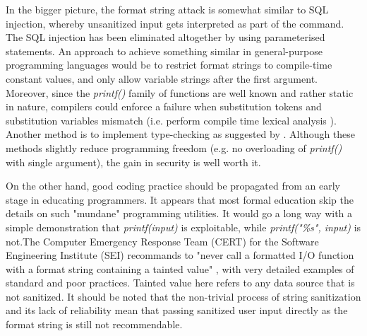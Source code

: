 In the bigger picture, the format string attack is somewhat similar to SQL injection, whereby unsanitized input gets interpreted as part of the command. The SQL injection has been eliminated altogether by using parameterised statements. An approach to achieve something similar in general-purpose programming languages would be to restrict format strings to compile-time constant values, and only allow variable strings after the first argument. Moreover, since the \emph{printf()} family of functions are well known and rather static in nature, compilers could enforce a failure when substitution tokens and substitution variables mismatch (i.e. perform compile time lexical analysis \cite{alanpscan}). Another method is to implement type-checking as suggested by \cite{Weitz2014}. Although these methods slightly reduce programming freedom (e.g. no overloading of \emph{printf()} with single argument), the gain in security is well worth it.

On the other hand, good coding practice should be propagated from an early stage in educating programmers. It appears that most formal education skip the details on such "mundane" programming utilities. It would go a long way with a simple demonstration that \emph{printf(input)} is exploitable, while \emph{printf("\%s", input)} is not.The Computer Emergency Response Team (CERT) for the Software Engineering Institute (SEI) recommands to "never call a formatted I/O function with a format string containing a tainted value" \cite{burch_cert}, with very detailed examples of standard and poor practices. Tainted value here refers to any data source that is not sanitized. It should be noted that the non-trivial process of string sanitization and its lack of reliability mean that passing sanitized user input directly as the format string is still not recommendable.